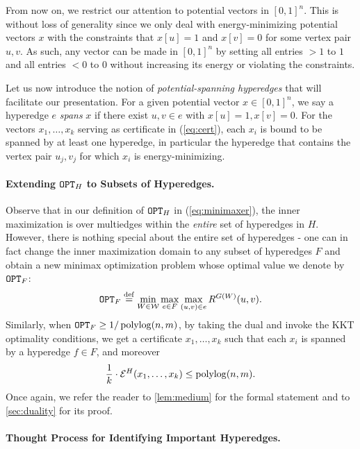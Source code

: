 \documentclass{article}
\begin{document}
From now on, we restrict our attention to potential
vectors in $[0,1]^n$.
This is without loss of generality since
we only deal with energy-minimizing potential vectors $x$
with the constraints that $x[u] = 1$ and $x[v]=0$ for some vertex pair $u,v$.
As such, any vector can be made in $[0,1]^n$ by setting all entries $>1$ to $1$
and all entries $<0$ to $0$ without increasing its energy or violating the constraints.

Let us now introduce the notion of \textit{potential-spanning hyperedges}
that will facilitate
our presentation.
For a given potential vector $x\in [0,1]^{n}$,
we say a hyperedge $e$ \textit{spans} $x$
if there exist $u,v\in e$ with $x[u] = 1, x[v]=0$.
For the vectors $x_1,\ldots,x_k$ serving as certificate in (\ref{eq:cert}),
each $x_i$ is bound to be spanned by at least one hyperedge,
in particular the hyperedge that contains the vertex pair $u_j,v_j$ for which
$x_i$ is energy-minimizing.

\paragraph{Extending $\mathtt{OPT}_H$ to Subsets of Hyperedges.}
Observe that in our definition of $\mathtt{OPT}_H$ in (\ref{eq:minimaxer}),
the inner maximization is over multiedges within
the \textit{entire} set of hyperedges in $H$.
However, there is nothing special about the entire set of hyperedges -
one can in fact change the inner maximization domain to any subset of hyperedges $F$
and obtain a new minimax optimization problem whose optimal value we denote by
$\mathtt{OPT}_F$:
\begin{align}\label{eq:minimaxer2}
    \mathtt{OPT}_F \stackrel{\mathrm{def}}{=} \min_{W\in \mathcal{W}} \max_{e\in F} \max_{(u,v)\in e}
    R^{G(W)} (u,v).
\end{align}
Similarly,
when $\mathtt{OPT}_F\geq 1/\operatorname{polylog}(n,m)$,
by taking the dual and invoke the KKT optimality conditions,
we get a certificate $x_1,\ldots,x_k$ such that
each $x_i$ is spanned by a hyperedge $f\in F$,
and moreover
\begin{align}
    \frac{1}{k}\cdot \mathcal{E}^H(x_1,\ldots,x_k) \leq \operatorname{polylog}(n,m).
\end{align}
Once again, we refer the reader to \cref{lem:medium} for the formal statement
and to \cref{sec:duality} for its proof.

\paragraph{Thought Process for Identifying Important Hyperedges.}
\end{document}
